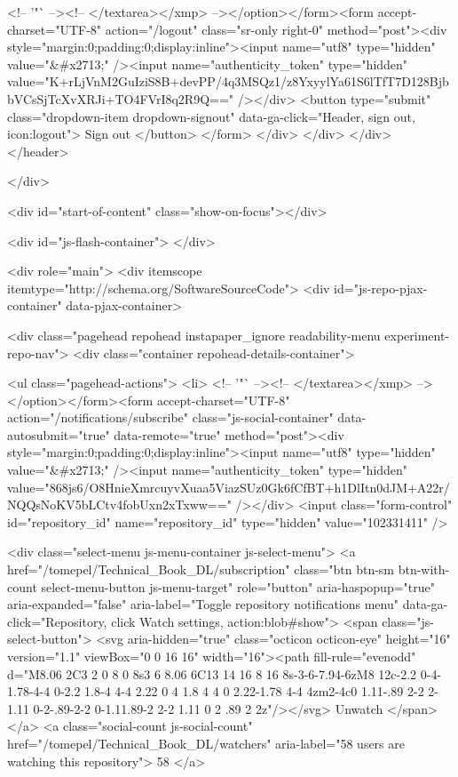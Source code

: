         <!-- '"` --><!-- </textarea></xmp> --></option></form><form accept-charset="UTF-8" action="/logout" class="sr-only right-0" method="post"><div style="margin:0;padding:0;display:inline"><input name="utf8" type="hidden" value="&#x2713;" /><input name="authenticity_token" type="hidden" value="K+rLjVnM2GuIziS8B+devPP/4q3MSQz1/z8YxyylYa61S6lTfT7D128BjbbVCsSjTcXvXRJi+TO4FVrI8q2R9Q==" /></div>
          <button type="submit" class="dropdown-item dropdown-signout" data-ga-click="Header, sign out, icon:logout">
            Sign out
          </button>
</form>      </div>
    </div>
  </div>
</header>


      

  </div>

  <div id="start-of-content" class="show-on-focus"></div>

    <div id="js-flash-container">
</div>



  <div role="main">
        <div itemscope itemtype="http://schema.org/SoftwareSourceCode">
    <div id="js-repo-pjax-container" data-pjax-container>
      





    <div class="pagehead repohead instapaper_ignore readability-menu experiment-repo-nav">
      <div class="container repohead-details-container">

        <ul class="pagehead-actions">
  <li>
        <!-- '"` --><!-- </textarea></xmp> --></option></form><form accept-charset="UTF-8" action="/notifications/subscribe" class="js-social-container" data-autosubmit="true" data-remote="true" method="post"><div style="margin:0;padding:0;display:inline"><input name="utf8" type="hidden" value="&#x2713;" /><input name="authenticity_token" type="hidden" value="868js6/O8HnieXmrcuyvXuaa5ViazSUz0Gk6fCfBT+h1DlItn0dJM+A22r/NQQsNoKV5bLCtv4fobUxn2xTxww==" /></div>      <input class="form-control" id="repository_id" name="repository_id" type="hidden" value="102331411" />

        <div class="select-menu js-menu-container js-select-menu">
          <a href="/tomepel/Technical_Book_DL/subscription"
            class="btn btn-sm btn-with-count select-menu-button js-menu-target"
            role="button"
            aria-haspopup="true"
            aria-expanded="false"
            aria-label="Toggle repository notifications menu"
            data-ga-click="Repository, click Watch settings, action:blob#show">
            <span class="js-select-button">
                <svg aria-hidden="true" class="octicon octicon-eye" height="16" version="1.1" viewBox="0 0 16 16" width="16"><path fill-rule="evenodd" d="M8.06 2C3 2 0 8 0 8s3 6 8.06 6C13 14 16 8 16 8s-3-6-7.94-6zM8 12c-2.2 0-4-1.78-4-4 0-2.2 1.8-4 4-4 2.22 0 4 1.8 4 4 0 2.22-1.78 4-4 4zm2-4c0 1.11-.89 2-2 2-1.11 0-2-.89-2-2 0-1.11.89-2 2-2 1.11 0 2 .89 2 2z"/></svg>
                Unwatch
            </span>
          </a>
            <a class="social-count js-social-count"
              href="/tomepel/Technical_Book_DL/watchers"
              aria-label="58 users are watching this repository">
              58
            </a>


